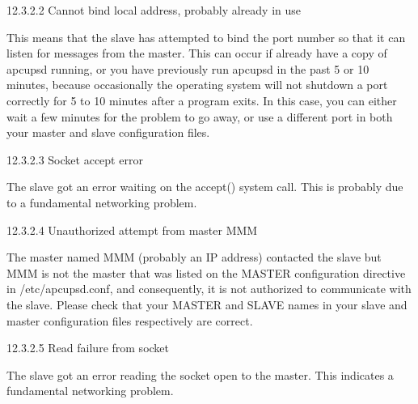 {{{{{{{{{\label{Cannot-bind-local-address_003b-probably-already-in-use}

{\small12.3.2.2 Cannot bind local address, probably already in use}

This means that the slave has attempted to bind the port number so that it can
listen for messages from the master. This can occur if already have a copy of
apcupsd running, or you have previously run apcupsd in the past 5 or 10
minutes, because occasionally the operating system will not shutdown a port
correctly for 5 to 10 minutes after a program exits. In this case, you can
either wait a few minutes for the problem to go away, or use a different port
in both your master and slave configuration files. 

\label{Socket-accept-error}

{\small12.3.2.3 Socket accept error}

The slave got an error waiting on the accept() system call. This is probably
due to a fundamental networking problem. 

\label{Unauthorized-attempt-from-master-MMM}

{\small12.3.2.4 Unauthorized attempt from master MMM}

The master named MMM (probably an IP address) contacted the slave but MMM is
not the master that was listed on the MASTER configuration directive in
/etc/apcupsd.conf, and consequently, it is not authorized to communicate with
the slave. Please check that your MASTER and SLAVE names in your slave and
master configuration files respectively are correct. 

\label{Read-failure-from-socket}

{\small12.3.2.5 Read failure from socket}

The slave got an error reading the socket open to the master. This indicates a
fundamental networking problem. 

}}}}}}}}}
